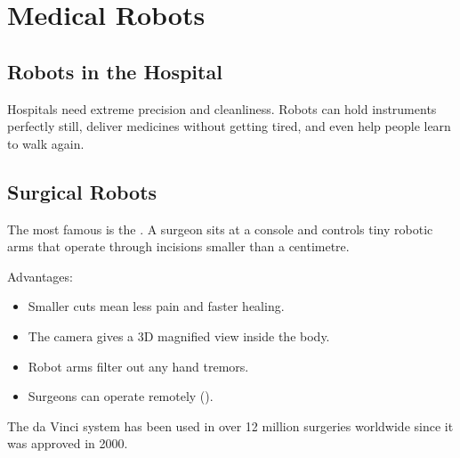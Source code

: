 
\chapter{Medical Robots}


\section*{Robots in the Hospital}

Hospitals need extreme precision and cleanliness. Robots can
hold instruments perfectly still, deliver medicines without getting
tired, and even help people learn to walk again.


\sectionrule

\section*{Surgical Robots}

The most famous is the \textbf{}. A surgeon
sits at a console and controls tiny robotic arms that operate through
incisions smaller than a centimetre.

Advantages:
\begin{itemize}
  \item Smaller cuts mean less pain and faster healing.
  \item The camera gives a 3D magnified view inside the body.
  \item Robot arms filter out any hand tremors.
  \item Surgeons can operate remotely ().
\end{itemize}

\begin{funfact}
  The da Vinci system has been used in over 12 million surgeries
  worldwide since it was approved in 2000.
\end{funfact}

